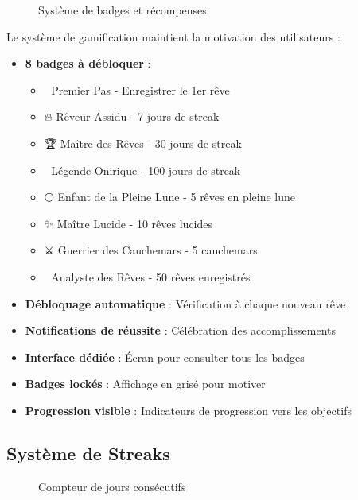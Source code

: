 \documentclass[12pt,a4paper]{article}
\begin{document}
\begin{figure}[H]
    \centering
    \caption{Système de badges et récompenses}
\end{figure}

Le système de gamification maintient la motivation des utilisateurs :

\begin{itemize}
    \item \textbf{8 badges à débloquer} :
    \begin{itemize}
        \item 🌟 Premier Pas - Enregistrer le 1er rêve
        \item 🔥 Rêveur Assidu - 7 jours de streak
        \item 🏆 Maître des Rêves - 30 jours de streak
        \item 👑 Légende Onirique - 100 jours de streak
        \item 🌕 Enfant de la Pleine Lune - 5 rêves en pleine lune
        \item ✨ Maître Lucide - 10 rêves lucides
        \item ⚔️ Guerrier des Cauchemars - 5 cauchemars
        \item 🔮 Analyste des Rêves - 50 rêves enregistrés
    \end{itemize}
    \item \textbf{Débloquage automatique} : Vérification à chaque nouveau rêve
    \item \textbf{Notifications de réussite} : Célébration des accomplissements
    \item \textbf{Interface dédiée} : Écran pour consulter tous les badges
    \item \textbf{Badges lockés} : Affichage en grisé pour motiver
    \item \textbf{Progression visible} : Indicateurs de progression vers les objectifs
\end{itemize}

\subsection{Système de Streaks}

\begin{figure}[H]
    \centering
    \caption{Compteur de jours consécutifs}
\end{figure}
\end{document}
